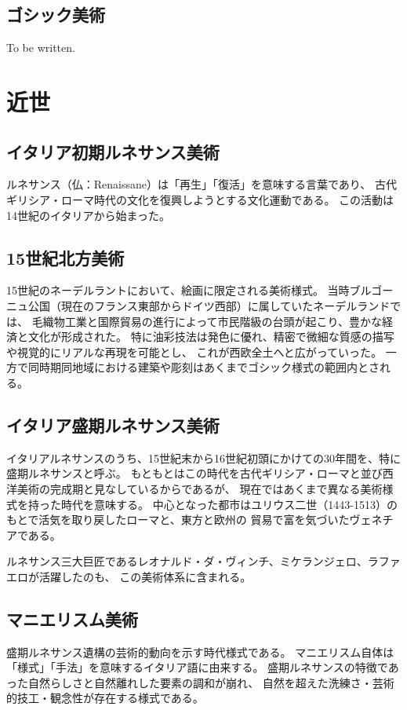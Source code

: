 \documentclass[letterpaper,10pt,dvipdfmx]{sphinxmanual}
\begin{document}
\subsection{ゴシック美術}
\label{\detokenize{category:id13}}
To be written.


\section{近世}
\label{\detokenize{category:id14}}

\subsection{イタリア初期ルネサンス美術}
\label{\detokenize{category:id15}}
ルネサンス（仏：Renaissane）は「再生」「復活」を意味する言葉であり、
古代ギリシア・ローマ時代の文化を復興しようとする文化運動である。
この活動は14世紀のイタリアから始まった。


\subsection{15世紀北方美術}
\label{\detokenize{category:id16}}
15世紀のネーデルラントにおいて、絵画に限定される美術様式。
当時ブルゴーニュ公国（現在のフランス東部からドイツ西部）に属していたネーデルランドでは、
毛織物工業と国際貿易の進行によって市民階級の台頭が起こり、豊かな経済と文化が形成された。
特に油彩技法は発色に優れ、精密で微細な質感の描写や視覚的にリアルな再現を可能とし、
これが西欧全土へと広がっていった。
一方で同時期同地域における建築や彫刻はあくまでゴシック様式の範囲内とされる。


\subsection{イタリア盛期ルネサンス美術}
\label{\detokenize{category:id17}}
イタリアルネサンスのうち、15世紀末から16世紀初頭にかけての30年間を、特に盛期ルネサンスと呼ぶ。
もともとはこの時代を古代ギリシア・ローマと並び西洋美術の完成期と見なしているからであるが、
現在ではあくまで異なる美術様式を持った時代を意味する。
中心となった都市はユリウス二世（1443-1513）のもとで活気を取り戻したローマと、東方と欧州の
貿易で富を気づいたヴェネチアである。

ルネサンス三大巨匠であるレオナルド・ダ・ヴィンチ、ミケランジェロ、ラファエロが活躍したのも、
この美術体系に含まれる。


\subsection{マニエリスム美術}
\label{\detokenize{category:id18}}
盛期ルネサンス遺構の芸術的動向を示す時代様式である。
マニエリスム自体は「様式」「手法」を意味するイタリア語に由来する。
盛期ルネサンスの特徴であった自然らしさと自然離れした要素の調和が崩れ、
自然を超えた洗練さ・芸術的技工・観念性が存在する様式である。
\end{document}
